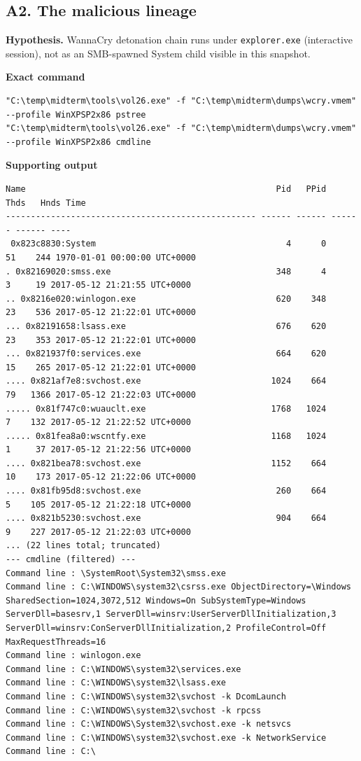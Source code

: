 \documentclass[11pt,letterpaper]{article}
\begin{document}
\subsection*{A2. The malicious lineage}
\textbf{Hypothesis.} WannaCry detonation chain runs under \texttt{explorer.exe} (interactive session), not as an SMB-spawned System child visible in this snapshot.
\par\medskip\noindent\textbf{Exact command}
\begin{lstlisting}
"C:\temp\midterm\tools\vol26.exe" -f "C:\temp\midterm\dumps\wcry.vmem" --profile WinXPSP2x86 pstree
"C:\temp\midterm\tools\vol26.exe" -f "C:\temp\midterm\dumps\wcry.vmem" --profile WinXPSP2x86 cmdline
\end{lstlisting}
\noindent\textbf{Supporting output}
\begin{lstlisting}
Name                                                  Pid   PPid   Thds   Hnds Time
-------------------------------------------------- ------ ------ ------ ------ ----
 0x823c8830:System                                      4      0     51    244 1970-01-01 00:00:00 UTC+0000
. 0x82169020:smss.exe                                 348      4      3     19 2017-05-12 21:21:55 UTC+0000
.. 0x8216e020:winlogon.exe                            620    348     23    536 2017-05-12 21:22:01 UTC+0000
... 0x82191658:lsass.exe                              676    620     23    353 2017-05-12 21:22:01 UTC+0000
... 0x821937f0:services.exe                           664    620     15    265 2017-05-12 21:22:01 UTC+0000
.... 0x821af7e8:svchost.exe                          1024    664     79   1366 2017-05-12 21:22:03 UTC+0000
..... 0x81f747c0:wuauclt.exe                         1768   1024      7    132 2017-05-12 21:22:52 UTC+0000
..... 0x81fea8a0:wscntfy.exe                         1168   1024      1     37 2017-05-12 21:22:56 UTC+0000
.... 0x821bea78:svchost.exe                          1152    664     10    173 2017-05-12 21:22:06 UTC+0000
.... 0x81fb95d8:svchost.exe                           260    664      5    105 2017-05-12 21:22:18 UTC+0000
.... 0x821b5230:svchost.exe                           904    664      9    227 2017-05-12 21:22:03 UTC+0000
... (22 lines total; truncated)
--- cmdline (filtered) ---
Command line : \SystemRoot\System32\smss.exe
Command line : C:\WINDOWS\system32\csrss.exe ObjectDirectory=\Windows SharedSection=1024,3072,512 Windows=On SubSystemType=Windows ServerDll=basesrv,1 ServerDll=winsrv:UserServerDllInitialization,3 ServerDll=winsrv:ConServerDllInitialization,2 ProfileControl=Off MaxRequestThreads=16
Command line : winlogon.exe
Command line : C:\WINDOWS\system32\services.exe
Command line : C:\WINDOWS\system32\lsass.exe
Command line : C:\WINDOWS\system32\svchost -k DcomLaunch
Command line : C:\WINDOWS\system32\svchost -k rpcss
Command line : C:\WINDOWS\System32\svchost.exe -k netsvcs
Command line : C:\WINDOWS\system32\svchost.exe -k NetworkService
Command line : C:\
\end{lstlisting}
\end{document}
